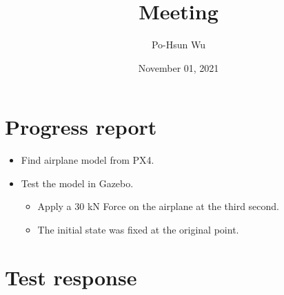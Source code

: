 \documentclass{beamer}
\date{November 01, 2021}
\title{Meeting}
\author{Po-Hsun Wu}
\begin{document}
    \frame{\titlepage}

    \section{Progress report}

    \begin{frame}{\secname}
        \begin{itemize}
            \item Find airplane model from PX4.
            \item Test the model in Gazebo.
            \begin{itemize}
                \item Apply a 30 kN Force on the airplane at the third second.
                \item The initial state was fixed at the original point.
            \end{itemize}
        \end{itemize}
    \end{frame}

    \section{Test response}
\end{document}
